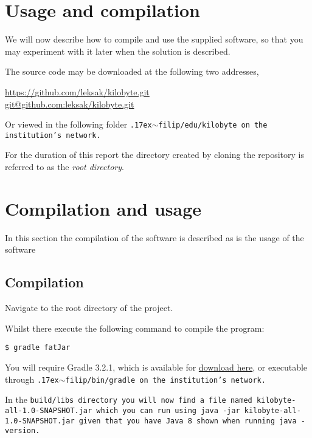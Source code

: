 \section{Usage and compilation}

We will now describe how to compile and use the supplied software, so
that you may experiment with it later when the solution is described.

The source code may be downloaded at the following two addresses,

\begin{center}
\url{https://github.com/leksak/kilobyte.git} \\
\url{git@github.com:leksak/kilobyte.git}
\end{center}

Or viewed in the following folder
\tt{\raise.17ex\hbox{$\scriptstyle\mathtt{\sim}$}filip/edu/kilobyte}
on the institution's network.

For the duration of this report the directory created by cloning
the repository is referred to as the \emph{root directory}.

\section{Compilation and usage}

In this section the compilation of the software is described as
is the usage of the software

\subsection{Compilation}

Navigate to the root directory of the project.

Whilst there execute the following command to compile the program:

\begin{lstlisting}[style=plain]
$ gradle fatJar
\end{lstlisting}

You will require Gradle 3.2.1, which is available for
\href{http://gradle.org/gradle-download/}{download here}, or
executable through
\tt{\raise.17ex\hbox{$\scriptstyle\mathtt{\sim}$}filip/bin/gradle}
on the institution's network.

In the \tt{build/libs} directory you will now find a file named
\tt{kilobyte-all-1.0-SNAPSHOT.jar} which you can run using \tt{java -jar
  kilobyte-all-1.0-SNAPSHOT.jar} given that you have Java 8 shown when running
\tt{java -version}.

